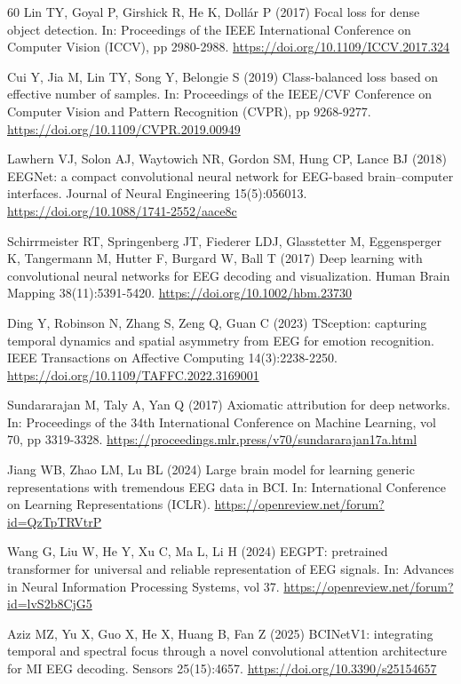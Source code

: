 \documentclass[pdflatex,sn-basic,Numbered,twocolumn,iicol]{sn-jnl}
\theoremstyle{thmstyleone}%
\theoremstyle{thmstyletwo}%
\theoremstyle{thmstylethree}%
\begin{document}
\begin{thebibliography}{60}
 Lin TY, Goyal P, Girshick R, He K, Doll\'ar P (2017) Focal loss for dense object detection. In: Proceedings of the IEEE International Conference on Computer Vision (ICCV), pp 2980-2988. \url{https://doi.org/10.1109/ICCV.2017.324}

 Cui Y, Jia M, Lin TY, Song Y, Belongie S (2019) Class-balanced loss based on effective number of samples. In: Proceedings of the IEEE/CVF Conference on Computer Vision and Pattern Recognition (CVPR), pp 9268-9277. \url{https://doi.org/10.1109/CVPR.2019.00949}

 Lawhern VJ, Solon AJ, Waytowich NR, Gordon SM, Hung CP, Lance BJ (2018) EEGNet: a compact convolutional neural network for EEG-based brain--computer interfaces. Journal of Neural Engineering 15(5):056013. \url{https://doi.org/10.1088/1741-2552/aace8c}

 Schirrmeister RT, Springenberg JT, Fiederer LDJ, Glasstetter M, Eggensperger K, Tangermann M, Hutter F, Burgard W, Ball T (2017) Deep learning with convolutional neural networks for EEG decoding and visualization. Human Brain Mapping 38(11):5391-5420. \url{https://doi.org/10.1002/hbm.23730}

 Ding Y, Robinson N, Zhang S, Zeng Q, Guan C (2023) TSception: capturing temporal dynamics and spatial asymmetry from EEG for emotion recognition. IEEE Transactions on Affective Computing 14(3):2238-2250. \url{https://doi.org/10.1109/TAFFC.2022.3169001}

 Sundararajan M, Taly A, Yan Q (2017) Axiomatic attribution for deep networks. In: Proceedings of the 34th International Conference on Machine Learning, vol 70, pp 3319-3328. \url{https://proceedings.mlr.press/v70/sundararajan17a.html}

 Jiang WB, Zhao LM, Lu BL (2024) Large brain model for learning generic representations with tremendous EEG data in BCI. In: International Conference on Learning Representations (ICLR). \url{https://openreview.net/forum?id=QzTpTRVtrP}

 Wang G, Liu W, He Y, Xu C, Ma L, Li H (2024) EEGPT: pretrained transformer for universal and reliable representation of EEG signals. In: Advances in Neural Information Processing Systems, vol 37. \url{https://openreview.net/forum?id=lvS2b8CjG5}

 Aziz MZ, Yu X, Guo X, He X, Huang B, Fan Z (2025) BCINetV1: integrating temporal and spectral focus through a novel convolutional attention architecture for MI EEG decoding. Sensors 25(15):4657. \url{https://doi.org/10.3390/s25154657}


\end{thebibliography}
\end{document}
